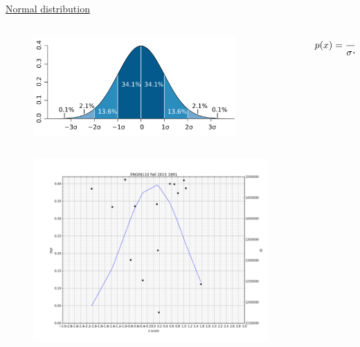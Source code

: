 \documentclass[aspectratio=1610,pdftex,dvipsnames,compress,xcolor={dvipsnames}]{beamer}
\begin{document}
\begin{frame}{\href{https://uidaho.pressbooks.pub/riskassessment/chapter/common-statistical-distributions/}{Normal distribution}}
    \begin{columns}[c]

        \begin{column}{0.60\textwidth}
            \begin{figure}
                \centering
                \includegraphics[width=0.85\textwidth]{normal.distribution.png}
            \end{figure}
        \end{column}

        \begin{column}{0.40\textwidth}
            \begin{equation}
                \large
                p(x) = \frac{1}{\sigma\sqrt{2\pi}} \; e^{-\frac{1}{2}(\frac{x-\mu}{\sigma})^2}
            \end{equation}
        \end{column}

    \end{columns}
\end{frame}


\begin{frame}{}
    \begin{figure}
        \centering
        \includegraphics[width=0.80\textwidth]{class.png}
    \end{figure}
\end{frame}
\end{document}

